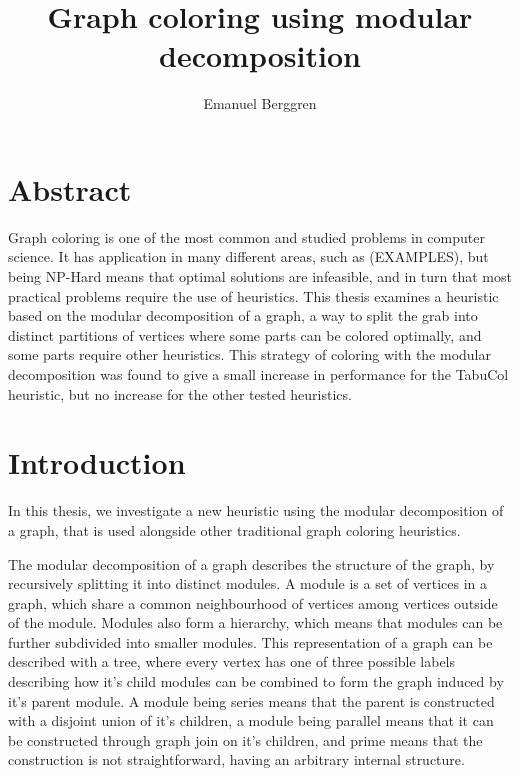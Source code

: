 \documentclass{amsart}
\author{Emanuel Berggren}
\title{Graph coloring using modular decomposition}
\begin{document}
\maketitle

\section{Abstract}


Graph coloring is one of the most common and studied problems in computer
science. It has application in many different areas, such as (EXAMPLES), but
being NP-Hard means that optimal solutions are infeasible, and in turn that most
practical problems require the use of heuristics. This thesis examines a
heuristic based on the modular decomposition of a graph, a way to split the grab
into distinct partitions of vertices where some parts can be colored optimally,
and some parts require other heuristics. This strategy of coloring with the
modular decomposition was found to give a small increase in performance for the
TabuCol heuristic, but no increase for the other tested heuristics.




\section{Introduction}

In this thesis, we investigate a new heuristic using the modular decomposition of
a graph, that is used alongside other traditional graph coloring heuristics.

The modular decomposition of a graph describes the structure of the graph, by
recursively splitting it into distinct modules. A module is a set of vertices in
a graph, which share a common neighbourhood of vertices among vertices outside
of the module. Modules also form a hierarchy, which means that modules can be
further subdivided into smaller modules. This representation of a graph can be
described with a tree, where every vertex has one of three possible labels
describing how it's child modules can be combined to form the graph induced by
it's parent module. A module being series means that the parent is constructed
with a disjoint union of it's children, a module being parallel means that it
can be constructed through graph join on it's children, and prime means that the
construction is not straightforward, having an arbitrary internal structure.
\end{document}
